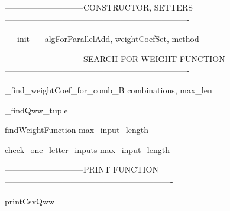 -----------------------------CONSTRUCTOR, SETTERS-------------------------------------------------------------------

\begin{method}{\_\_init\_\_}{ algForParallelAdd, weightCoefSet, method}

\end{method}

-----------------------------SEARCH FOR WEIGHT FUNCTION-------------------------------------------------------------------

\begin{method}{\_find\_weightCoef\_for\_comb\_B}{ combinations, max\_len}

\end{method}


\begin{method}{\_findQw}{w\_tuple}

\end{method}


\begin{method}{findWeightFunction}{ max\_input\_length}

\end{method}


\begin{method}{check\_one\_letter\_inputs}{ max\_input\_length}

\end{method}


-----------------------------PRINT FUNCTION-------------------------------------------------------------

\begin{method}{printCsvQww}{}

\end{method}